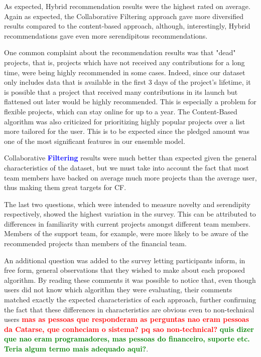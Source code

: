 \documentclass[cic,tc,english]{iiufrgs}
\newcommand{\bruno}[1]{\textcolor{red}{\textbf{#1}}}
\newcommand{\adriano}[1]{\textcolor{blue}{\textbf{#1}}}
\newcommand{\pergunta}[1]{\textcolor{green}{\textbf{#1}}}
\begin{document}
As expected, Hybrid recommendation results were the highest rated on average. Again as expected, the Collaborative Filtering approach gave more diversified results compared to the content-based approach, although, interestingly, Hybrid recommendations gave even more serendipitous recommendations. 

One common complaint about the recommendation results was that "dead" projects, that is, projects which have not received any contributions for a long time, were being highly recommended in some cases. Indeed, since our dataset only includes data that is available in the first 3 days of the project's lifetime, it is possible that a project that received many contributions in its launch but flattened out later would be highly recommended. This is especially a problem for flexible projects, which can stay online for up to a year. The Content-Based algorithm was also criticized for prioritizing highly popular projects over a list more tailored for the user. This is to be expected since the pledged amount was one of the most significant features in our ensemble model.

Collaborative \adriano{Filtering} results were much better than expected given the general characteristics of the dataset, but we must take into account the fact that most team members have backed on average much more projects than the average user, thus making them great targets for CF. 

The last two questions, which were intended to measure novelty and serendipity respectively, showed the highest variation in the survey. This can be attributed to differences in familiarity with current projects amongst different team members. Members of the support team, for example, were more likely to be aware of the recommended projects than members of the financial team.

An additional question was added to the survey letting participants inform, in free form, general observations that they wished to make about each proposed algorithm. By reading these comments it was possible to notice that, even though users did not know which algorithm they were evaluating, their comments matched exactly the expected characteristics of each approach, further confirming the fact that these differences in characteristics are obvious even to non-technical users \bruno{mas as pessoas que responderam as perguntas nao eram pessoas da Catarse, que conheciam o sistema? pq sao non-technical?} \pergunta{quis dizer que nao eram programadores, mas pessoas do financeiro, suporte etc. Teria algum termo mais adequado aqui?}.
\end{document}
